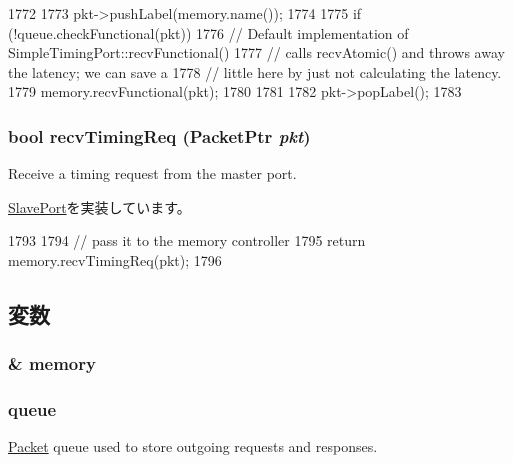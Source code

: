 \begin{DoxyCode}
1772 {
1773     pkt->pushLabel(memory.name());
1774 
1775     if (!queue.checkFunctional(pkt)) {
1776         // Default implementation of SimpleTimingPort::recvFunctional()
1777         // calls recvAtomic() and throws away the latency; we can save a
1778         // little here by just not calculating the latency.
1779         memory.recvFunctional(pkt);
1780     }
1781 
1782     pkt->popLabel();
1783 }
\end{DoxyCode}
\hypertarget{classDRAMCtrl_1_1MemoryPort_a8a15a0ae9c080c5f879fc5e791a9e3e7}{
\subsubsection[{recvTimingReq}]{\setlength{\rightskip}{0pt plus 5cm}bool recvTimingReq ({\bf PacketPtr} {\em pkt})}}
\label{classDRAMCtrl_1_1MemoryPort_a8a15a0ae9c080c5f879fc5e791a9e3e7}
Receive a timing request from the master port. 

\hyperlink{classSlavePort_abcece77e42f88ee41af8d3d01bb48253}{SlavePort}を実装しています。


\begin{DoxyCode}
1793 {
1794     // pass it to the memory controller
1795     return memory.recvTimingReq(pkt);
1796 }
\end{DoxyCode}


\subsection{変数}
\hypertarget{classDRAMCtrl_1_1MemoryPort_aab24e4ab19c79062554e1ad4bb0c5eb7}{
\subsubsection[{memory}]{\& {\bf memory}}}
\label{classDRAMCtrl_1_1MemoryPort_aab24e4ab19c79062554e1ad4bb0c5eb7}
\hypertarget{classDRAMCtrl_1_1MemoryPort_a3055168363a9ed42f38173363b6c1975}{
\subsubsection[{queue}]{ {\bf queue}}}
\label{classDRAMCtrl_1_1MemoryPort_a3055168363a9ed42f38173363b6c1975}
\hyperlink{classPacket}{Packet} queue used to store outgoing requests and responses. 

